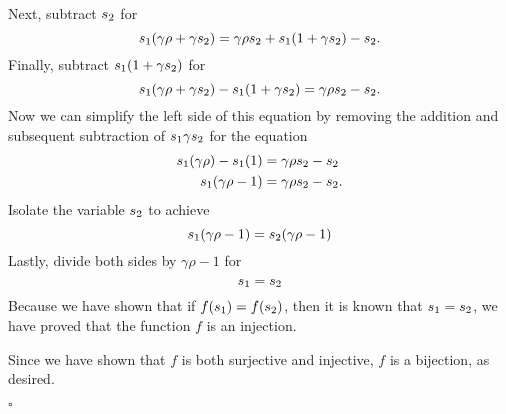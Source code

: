 \documentclass[12pt]{exam}
\begin{document}
\begin{questions}
Next, subtract $s\textsubscript{2}$ for
\begin{equation*}
 s\textsubscript{1}(\gamma \rho + \gamma s\textsubscript{2}) = \gamma \rho s\textsubscript{2} + s\textsubscript{1}(1 + \gamma s\textsubscript{2}) - s\textsubscript{2}.
 \end{equation*}
Finally, subtract $s\textsubscript{1}(1+ \gamma s\textsubscript{2})$ for
\begin{equation*}
 s\textsubscript{1}(\gamma \rho + \gamma s\textsubscript{2}) - s\textsubscript{1}(1 + \gamma s\textsubscript{2})= \gamma \rho s\textsubscript{2} - s\textsubscript{2}.
 \end{equation*}
Now we can simplify the left side of this equation by removing the addition and subsequent subtraction of $s\textsubscript{1}\gamma s\textsubscript{2}$ for the equation 
 \begin{align*}
 s\textsubscript{1}(\gamma \rho) - s\textsubscript{1}(1) &= \gamma \rho s\textsubscript{2} - s\textsubscript{2} \\
s\textsubscript{1}(\gamma \rho -1) &= \gamma \rho s\textsubscript{2} - s\textsubscript{2}.
 \end{align*}
Isolate the variable $s\textsubscript{2}$ to achieve 
\begin{equation*}
s\textsubscript{1}(\gamma \rho -1) =  s\textsubscript{2}(\gamma \rho -1) 
\end{equation*}
Lastly, divide both sides by $\gamma \rho -1$ for
\begin{equation*}
s\textsubscript{1} = s\textsubscript{2}
\end{equation*}
Because we have shown that if $f(s\textsubscript{1}) = f(s\textsubscript{2})$, then it is known that $s\textsubscript{1} = s\textsubscript{2}$, we have proved that the function $f$ is an injection.
\par
Since we have shown that $f$ is both surjective and injective, $f$ is a bijection, as desired.
\begin{flushright}
$\square$
\end{flushright}


\end{questions}
\end{document}
